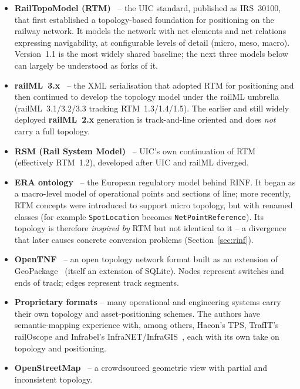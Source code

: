 \documentclass{ceurart}
\begin{document}
\begin{itemize}
  \item \textbf{RailTopoModel (RTM)}~\cite{rtm} -- the UIC standard, published as
        IRS~30100, that first established a topology-based foundation for
        positioning on the railway network. It models the network with net
        elements and net relations expressing navigability, at configurable
        levels of detail (micro, meso, macro). Version~1.1 is the most widely
        shared baseline; the next three models below can largely be understood 
        as forks of it.
  \item \textbf{railML~3.x}~\cite{railml} -- the XML serialisation that adopted
        RTM for positioning and then continued to develop the topology model
        under the railML umbrella (railML~3.1/3.2/3.3 tracking RTM~1.3/1.4/1.5).
        The earlier and still widely deployed \textbf{railML~2.x} generation is
        track-and-line oriented and does \emph{not} carry a full topology.
  \item \textbf{RSM (Rail System Model)}~\cite{rsm} -- UIC's own continuation of
        RTM (effectively RTM~1.2), developed after UIC and railML diverged.
  \item \textbf{ERA ontology}~\cite{eraontology,rinf} -- the European regulatory
        model behind RINF. It began as a macro-level model of operational points
        and sections of line; more recently, RTM concepts were introduced to
        support micro topology, but with renamed classes (for example
        \texttt{SpotLocation} becomes \texttt{NetPointReference}). Its topology
        is therefore \emph{inspired by} RTM but not identical to it -- a
        divergence that later causes concrete conversion problems
        (Section~\ref{sec:rinf}).
  \item \textbf{OpenTNF}~\cite{opentnf} -- an open topology network format built
        as an extension of GeoPackage~\cite{geopackage} (itself an extension of
        SQLite). Nodes represent switches and ends of track; edges represent
        track segments.
  \item \textbf{Proprietary formats} -- many operational and engineering systems
        carry their own topology and asset-positioning schemes. The authors have
        semantic-mapping experience with, among others, Hacon's TPS, TrafIT's
        railOscope and Infrabel's
        InfraNET/InfraGIS~\cite{hacontps,trafit,infrabel}, each with its own take
        on topology and positioning.
  \item \textbf{OpenStreetMap}~\cite{osm} -- a crowdsourced geometric view with
        partial and inconsistent topology.
\end{itemize}
\end{document}
